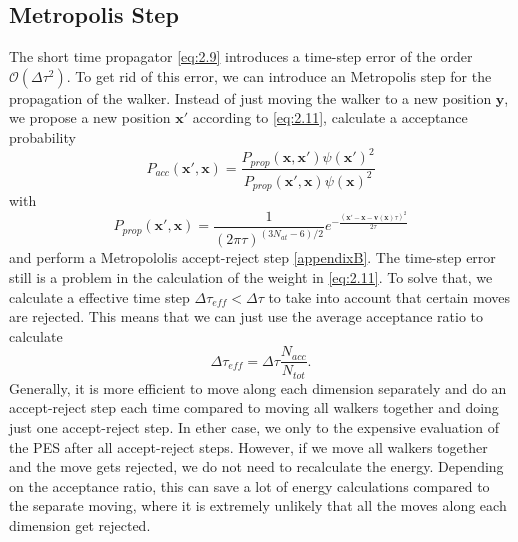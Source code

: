 \documentclass [12pt]{report}
\begin{document}
\subsection{Metropolis Step} \label{metro}
The short time propagator \eqref{eq:2.9} introduces a time-step error of the order $\mathcal{O}(\Delta \tau^2)$. To get rid of this error, we can introduce an Metropolis step for the propagation of the walker. Instead of just moving the walker to a new position $\bm{y}$, we propose a new position $\bm{x}'$ according to \eqref{eq:2.11}, calculate a acceptance probability 
\begin{equation}\label{Pacc}
P_{acc}(\bm{x}',\bm{x}) = \frac{P_{prop}(\bm{x},\bm{x}') \psi(\bm{x}')^2}{P_{prop}(\bm{x}',\bm{x}) \psi(\bm{x})^2}
\end{equation}
with
\begin{equation}\label{Pprop}
P_{prop}(\bm{x}',\bm{x}) = \frac{1}{(2\pi\tau)^{(3N_{at}-6)/2}} e^{-\frac{(\bm{x}'-\bm{x}-\bm{v}(\bm{x})\tau)^2}{2\tau}}
\end{equation}
and perform a Metropololis accept-reject step \ref{appendixB}.
The time-step error still is a problem in the calculation of the weight in \eqref{eq:2.11}. To solve that, we calculate a effective time step $\Delta \tau_{eff} < \Delta \tau$ to take into account that certain moves are rejected. This means that we can just use the average acceptance ratio to calculate
\begin{equation}\label{tau_eff}
\Delta \tau_{eff} = \Delta \tau \frac{N_{acc}}{N_{tot}}.
\end{equation}
Generally, it is more efficient to move along each dimension separately and do an accept-reject step each time compared to moving all walkers together and doing just one accept-reject step. In ether case, we only to the expensive evaluation of the PES after all accept-reject steps. However, if we move all walkers together and the move gets rejected, we do not need to recalculate the energy. Depending on the acceptance ratio, this can save a lot of energy calculations compared to the separate moving, where it is extremely unlikely that all the moves along each dimension get rejected.
\end{document}
